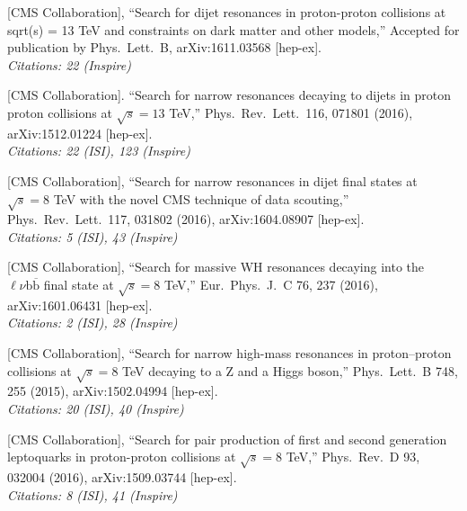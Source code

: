 \documentclass[10pt, a4paper]{article}
\begin{document}



\begin{thebibliography}{599}

  [CMS Collaboration],
  ``Search for dijet resonances in proton-proton collisions at sqrt(s) = 13 TeV and constraints on dark matter and other models,''
  Accepted for publication by Phys.\ Lett.\ B, arXiv:1611.03568
  [hep-ex]. \\
\emph{Citations: 22 (Inspire)}

  [CMS Collaboration].
  ``Search for narrow resonances decaying to 
  dijets in proton proton
  collisions at $\sqrt{s}=13$ TeV,''
  Phys.\ Rev.\ Lett.\  116, 071801 (2016), arXiv:1512.01224 [hep-ex]. \\
\emph{Citations: 22 (ISI), 123
  (Inspire)}

[CMS Collaboration],
  ``Search for narrow resonances in dijet final states at $\sqrt{s}=8$
  TeV with the novel CMS technique of data scouting,''
  Phys.\ Rev.\ Lett.\  117, 031802 (2016), arXiv:1604.08907 [hep-ex]. \\
\emph{Citations: 5 (ISI), 43 (Inspire)}

[CMS Collaboration],
  ``Search for massive WH resonances decaying into the $\ell \nu \mathrm{b} \overline{\mathrm{b}} $ final state at $\sqrt{s}=8$ TeV,''
  Eur.\ Phys.\ J.\ C 76, 237 (2016), arXiv:1601.06431 [hep-ex]. \\
\emph{Citations: 2 (ISI), 28 (Inspire)}

 [CMS Collaboration],
  ``Search for narrow high-mass resonances in proton–proton collisions
  at $\sqrt{s}=8$ TeV decaying to a Z and a Higgs boson,''
  Phys.\ Lett.\ B 748, 255 (2015), arXiv:1502.04994 [hep-ex].\\
\emph{Citations: 20 (ISI), 40 (Inspire)}

[CMS Collaboration],
  ``Search for pair production of first and second generation
  leptoquarks in proton-proton collisions at $\sqrt{s}=8$ TeV,''
  Phys.\ Rev.\ D  93, 032004 (2016), arXiv:1509.03744 [hep-ex].\\
\emph{Citations: 8 (ISI), 41 (Inspire)}


\end{thebibliography}
\end{document}
